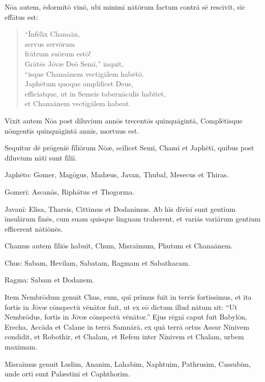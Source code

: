 \Versus Nōa autem, ēdormītō vīnō, ubi minimī nātōrum factum contrā sē rescīvit, sīc effātus est:


\begin{verse}
\begin{patverse*}
\Versus ``Īnfēlīx Chanaān,\\
servus servōrum\\
frātrum suōrum estō!\\
\Versus Grātēs Jōvæ Deō Semī,'' inquit,\\
``isque Chanaānem vectīgālem habētō.\\
\Versus Japhētum quoque amplificet Deus,\\
efficiatque, ut in Semeis tabernāculīs habitet,\\
et Chanaānem vectīgālem habeat.
\end{patverse*}
\end{verse}

\Versus Vīxit autem Nōa post dīluvium annōs trecentōs quīnquāgintā,
\Versus Complētīsque nōngentīs quīnquāgintā annīs, mortuus est.



\Caput
\Versus Sequitur dē prōgeniē fīliōrum Nōæ, scīlicet Semī, Chamī et Japhētī, quibus post dīluvium nātī sunt fīliī.

\Versus Japhēto: Gomer, Magōgus, Madæus, Javan, Thubal, Mesecus et Thiras.

\Versus Gomerī: Ascanās, Riphātus et Thogorma.

\Versus Javanī: Elisa, Tharsis, Cittimus et Dodanimus.
\Versus Ab hīs dīvīsī sunt gentium īnsulārum fīnēs, cum suam quisque linguam traherent, et variās variārum gentium efficerent nātiōnēs.

\Versus Chamus autem fīliōs habuit, Chum, Misraīmum, Phutum et Chanaānem.

\Versus Chus: Sabam, Hevilam, Sabatam, Ragmam et Sabathacam.

Ragma: Sabam et Dodanem.

\Versus Item Nembrōdum genuit Chus, eum, quī prīmus fuit in terrīs fortissimus,
\Versus et ita fortis in Jōvæ cōnspectū vēnātor fuit, ut ex eō dictum illud nātum sit: ``Ut Nembrōdus, fortis in Jōvæ cōnspectū vēnātor.''
\Versus Ejus rēgnī caput fuit Babylōn, Erecha, Accāda et Calane in terrā Samnārā,
\Versus ex quā terrā ortus Assur Nīnivem condidit, et Robothir, et Chalam,
\Versus et Refem inter Nīnivem et Chalam, urbem maximam.

\Versus Misraīmus genuit Ludim, Ananim, Lahabim,
\Versus Naphtuim, Pathrusim, Cassubim, unde ortī sunt Palæstīnī et Caphthorim.

